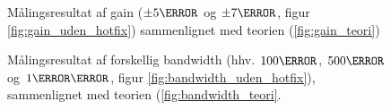 \begin{figure}[h!]
	\vspace*{-0.3 cm}
	\centering
  	\caption{Målingsresultat af gain ($\pm5\decibel$ og $\pm7\decibel$, figur \ref{fig:gain_uden_hotfix}) sammenlignet med teorien (\ref{fig:gain_teori})}
	\label{fig:gain}
\end{figure}

\begin{figure}[h!]
	\vspace*{-0.3 cm}
	\centering
  	\caption{Målingsresultat af forskellig bandwidth (hhv. $100\hertz$, $500\hertz$ og $1\kilo\hertz$, figur \ref{fig:bandwidth_uden_hotfix}), sammenlignet med teorien (\ref{fig:bandwidth_teori}.}
	\label{fig:bw}
\end{figure}

